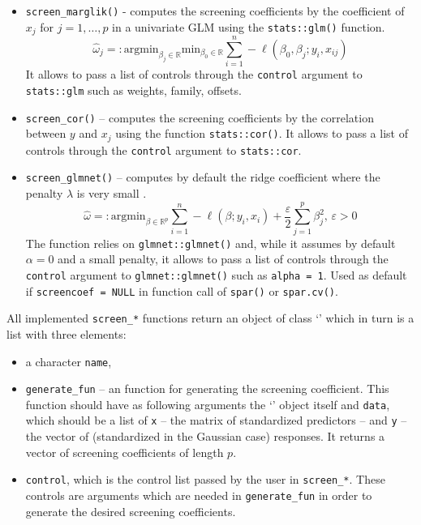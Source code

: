 \documentclass[
  article]{jss}
\newcommand{\class}[1]{`\code{#1}'}
\begin{document}
\begin{itemize}
\item
  \texttt{screen\_marglik()} - computes the screening coefficients by
  the coefficient of \(x_j\) for \(j =1,\dots,p\) in a univariate GLM
  using the \texttt{stats::glm()} function. \[
   \hat\omega_j=:\text{argmin}_{\beta_j\in \mathbb{R}}\text{min}_{{\beta_0}\in\mathbb{R}}\sum_{i=1}^n -\ell(\beta_0,\beta_j;y_i,x_{ij})
   \] It allows to pass a list of controls through the \texttt{control}
  argument to \texttt{stats::glm} such as weights, family, offsets.
\item
  \texttt{screen\_cor()} -- computes the screening coefficients by the
  correlation between \(y\) and \(x_j\) using the function
  \texttt{stats::cor()}. It allows to pass a list of controls through
  the \texttt{control} argument to \texttt{stats::cor}.
\item
  \texttt{screen\_glmnet()} -- computes by default the ridge coefficient
  where the penalty \(\lambda\) is very small \citep[see][ for
  clarification]{parzer2024glms}. \[
  \hat\omega=: \text{argmin}_{{\beta}\in\mathbb{R}^p}\sum_{i=1}^n -\ell(\beta;y_i,x_i) + \frac{\varepsilon}{2}\sum_{j=1}^p{\beta}_j^2, \, \varepsilon > 0
  \] The function relies on \texttt{glmnet::glmnet()} and, while it
  assumes by default \(\alpha = 0\) and a small penalty, it allows to
  pass a list of controls through the \texttt{control} argument to
  \texttt{glmnet::glmnet()} such as \texttt{alpha\ =\ 1}. Used as
  default if \texttt{screencoef\ =\ NULL} in function call of
  \texttt{spar()} or \texttt{spar.cv()}.
\end{itemize}

All implemented \texttt{screen\_*} functions return an object of class
\class{screencoef} which in turn is a list with three elements:

\begin{itemize}
\item
  a character \texttt{name},
\item
  \texttt{generate\_fun} -- an  function for generating the
  screening coefficient. This function should have as following
  arguments the \class{screencoef} object itself and \texttt{data},
  which should be a list of \texttt{x} -- the matrix of standardized
  predictors -- and \texttt{y} -- the vector of (standardized in the
  Gaussian case) responses. It returns a vector of screening
  coefficients of length \(p\).
\item
  \texttt{control}, which is the control list passed by the user in
  \texttt{screen\_*}. These controls are arguments which are needed in
  \texttt{generate\_fun} in order to generate the desired screening
  coefficients.
\end{itemize}
\end{document}
